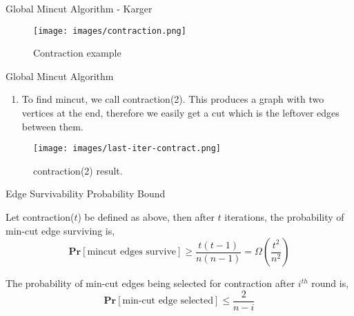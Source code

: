 \begin{frame}[fragile]{Global Mincut Algorithm - Karger}
    \begin{figure}
        \centering
        \texttt{[image: images/contraction.png]}
        \caption{Contraction example}
        \label{fig:contraction}
    \end{figure}
\end{frame}

\begin{frame}[fragile]{Global Mincut Algorithm}
    \begin{enumerate}
        \item To find mincut, we call contraction(2). This produces a graph with two vertices at the end, therefore we easily get a cut which is the leftover edges between them.
    \end{enumerate}
    \begin{figure}
        \centering
        \texttt{[image: images/last-iter-contract.png]}
        \caption{contraction(2) result. \cite{Arora_2010}}
        \label{fig:contraction-result}
    \end{figure}
\end{frame}

\begin{frame}{Edge Survivability Probability Bound}
    \setlength{\abovedisplayskip}{0pt}
    \setlength{\belowdisplayskip}{0pt}
    \setlength{\abovedisplayshortskip}{0pt}
    \setlength{\belowdisplayshortskip}{0pt}
    \begin{lemma}
        Let contraction($t$) be defined as above, then after $t$ iterations, the probability of min-cut edge surviving is,
        \[\textbf{Pr}[\text{mincut edges survive}] \geq \frac{t(t - 1)}{n(n - 1)} = \Omega\left(\frac{t^2}{n^2}\right)\]
    \end{lemma}
    \begin{lemma}
        \label{edge-surv-prob}
        The probability of min-cut edges being selected for contraction after $i^{th}$ round is,
        \[\textbf{Pr}[\text{min-cut edge selected}] \leq \frac{2}{n - i}\]
    \end{lemma}

\end{frame}

